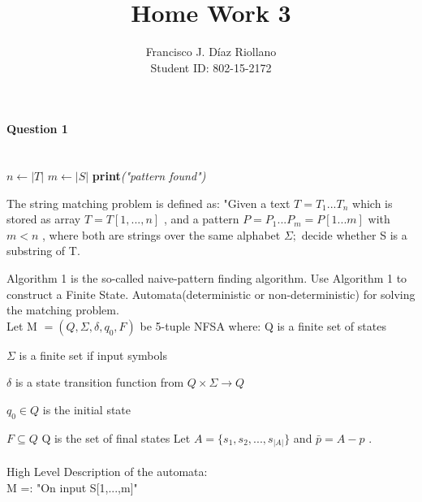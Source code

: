 \documentclass{report}
\title{Home Work 3}
\author{Francisco J. Díaz Riollano \\ Student ID: 802-15-2172 }
\newcommand{\me}[1]{
\begin{math}
#1
\end{math}
}
\begin{document}
\maketitle
\paragraph{\Large{Question 1\\ \\}}


\begin{algorithm}
  \begin{algorithmic}[1]
      \State $n\gets |T|$
      \State $m\gets |S|$
      	\State \textbf{print}\textit{("pattern found")}
      \EndIf
      \EndFor     
    \EndProcedure
  \end{algorithmic}
\end{algorithm}


The string matching problem is defined as: "Given a text \me{T=T_1 ... T_n} which is stored as array \me{T= T[1,...,n]} , and a pattern \me{P = P_1 ... P_m = P[1...m]} with \me{m<n}, where both are strings over the same alphabet \me{\Sigma;}decide whether S is a substring of T.

Algorithm 1 is the so-called naive-pattern finding algorithm. Use Algorithm 1 to construct a Finite State. Automata(deterministic or non-deterministic) for solving the matching problem. 
\\

Let M \me{=(Q,\Sigma,\delta,q_0,F)} be 5-tuple NFSA where: \newline
Q is a finite set of states \newline
\me{\Sigma} is a finite set if input symbols \newline
\me{\delta} is a state transition function from \me{Q \times \Sigma \rightarrow Q} \newline
\me{q_0 \in Q} is the initial state \newline
\me{F \subseteq Q} Q is the set of final states \newline
Let \me{A=\{s_1,s_2,...,s_{|A|}\}} and \me{\bar{p} = A -p}.
\\
\\
High Level Description of the automata: \\
M =: "On input S[1,...,m]"
\end{document}
